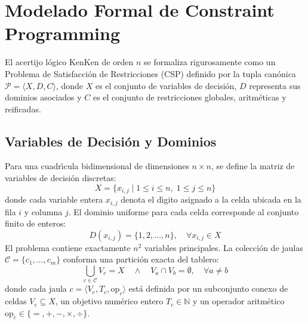 
\section{Modelado Formal de Constraint Programming}
\label{sec:cp_modeling}

El acertijo l\'ogico KenKen de orden $n$ se formaliza rigurosamente como un Problema de Satisfacci\'on de Restricciones (CSP) definido por la tupla can\'onica $\mathcal{P} = \langle X, D, C \rangle$, donde $X$ es el conjunto de variables de decisi\'on, $D$ representa sus dominios asociados y $C$ es el conjunto de restricciones globales, aritm\'eticas y reificadas.

\subsection{Variables de Decisi\'on y Dominios}
Para una cuadr\'{\i}cula bidimensional de dimensiones $n \times n$, se define la matriz de variables de decisi\'on discretas:
\begin{equation}
    X = \{x_{i,j} \mid 1 \le i \le n, \; 1 \le j \le n\}
\end{equation}
donde cada variable entera $x_{i,j}$ denota el d\'{\i}gito asignado a la celda ubicada en la fila $i$ y columna $j$. El dominio uniforme para cada celda corresponde al conjunto finito de enteros:
\begin{equation}
    D(x_{i,j}) = \{1, 2, \dots, n\}, \quad \forall x_{i,j} \in X
\end{equation}
El problema contiene exactamente $n^2$ variables principales. La colecci\'on de jaulas $\mathcal{C} = \{c_1, \dots, c_m\}$ conforma una partici\'on exacta del tablero:
\begin{equation}
    \bigcup_{c \in \mathcal{C}} V_c = X \quad \land \quad V_a \cap V_b = \emptyset, \quad \forall a \ne b
\end{equation}
donde cada jaula $c = \langle V_c, T_c, \text{op}_c \rangle$ est\'a definida por un subconjunto conexo de celdas $V_c \subseteq X$, un objetivo num\'erico entero $T_c \in \mathbb{N}$ y un operador aritm\'etico $\text{op}_c \in \{=, +, -, \times, \div\}$.

